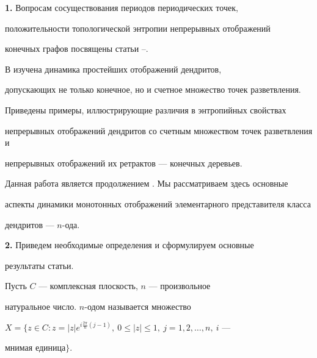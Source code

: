 \date{}







\pagestyle{plain} %













\maketitle








{\bf 1.} Вопросам сосуществования периодов периодических точек,


положительности топологической энтропии непрерывных отображений


конечных графов посвящены статьи \cite{Als}--\cite{Lli}.


В \cite{Efr} изучена динамика простейших отображений дендритов,


допускающих не только конечное, но и счетное множество точек разветвления.


Приведены примеры, иллюстрирующие различия в энтропийных свойствах


непрерывных отображений дендритов со счетным множеством точек разветвления и


непрерывных отображений их ретрактов --- конечных деревьев.





Данная работа является продолжением \cite{Efr}. Мы рассматриваем здесь основные


аспекты динамики монотонных отображений элементарного представителя класса


дендритов --- $n$-ода.


\medskip





{\bf 2.} Приведем необходимые определения и сформулируем основные


результаты статьи.





\begin{defn} Пусть $C$ --- комплексная плоскость, $n$ --- произвольное


натуральное число. $n$-одом называется множество


$X=\{z\in C:z=|z|e^{i\frac{2\pi}{n}(j-1)},


\ 0\le|z|\le 1, \ j=1,2,\dotsc,n, \ i$ ---


мнимая единица$\}$.


\end{defn}





